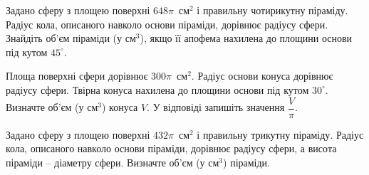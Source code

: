 \documentclass[12pt]{article}
\begin{document}
\begin{samepage}
\noindent\zadnum Задано сферу з площею поверхні $648\pi$~см$^2$ і правильну чотирикутну піраміду. Радіус кола, описаного навколо основи піраміди, дорівнює радіусу сфери. Знайдіть об'єм піраміди (у см$^3$), якщо її апофема нахилена до площини основи під кутом $45^\circ$. 

\nmtnobreak
\nopagebreak\nbvspace{0.5cm}
\nmtAnswerBox
\par{}
\end{samepage}

\begin{samepage}
\noindent\zadnum Площа поверхні сфери дорівнює $300\pi$~см$^2$. Радіус основи конуса дорівнює радіусу сфери. Твірна конуса нахилена до площини основи під кутом $30^\circ$. Визначте об'єм (у см$^3$) конуса $V$. У відповіді запишіть значення $\dfrac{V}{\pi}$. 

\nmtnobreak
\nopagebreak\nbvspace{0.5cm}
\nmtAnswerBox
\par{}
\end{samepage}

\begin{samepage}
\noindent\zadnum Задано сферу з площею поверхні $432\pi$~см$^2$ і правильну трикутну піраміду. Радіус кола, описаного навколо основи піраміди, дорівнює радіусу сфери, а висота піраміди – діаметру сфери. Визначте об'єм (у см$^3$) піраміди. 

\nmtnobreak
\nopagebreak\nbvspace{0.5cm}
\nmtAnswerBox
\par{}
\end{samepage}
\end{document}
